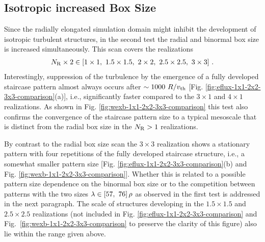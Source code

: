 \newpage
\subsection{Isotropic increased Box Size}
\label{sub:isotropic}

Since the radially elongated simulation domain might inhibit the development of isotropic turbulent structures, in the second test the radial and binormal box size is increased simultaneously.
This scan covers the realizations
\begin{gather*}
	N_\mathrm{R}\times2 \in [1\times1,~1.5\times1.5,~2\times2,~2.5\times2.5,~3\times3]~.
\end{gather*}
Interestingly, suppression of the turbulence by the emergence of a fully developed staircase pattern almost always occurs after $\sim 1000~R/v_{\mathrm{th}}$ [Fig. \ref{fig:eflux-1x1-2x2-3x3-comparison}(a)], i.e., significantly faster compared to the $3\times1$ and $4\times1$ realizations. 
As shown in Fig. \ref{fig:wexb-1x1-2x2-3x3-comparison} this test also confirms the convergence of the staircase pattern size to a typical mesoscale that is distinct from the radial box size in the $N_\mathrm{R} > 1$ realizations.


By contrast to the radial box size scan the $3\times3$ realization shows a stationary pattern with four repetitions of the fully developed staircase structure, i.e., a somewhat smaller pattern size [Fig. \ref{fig:eflux-1x1-2x2-3x3-comparison}(b) and Fig. \ref{fig:wexb-1x1-2x2-3x3-comparison}]. 
Whether this is related to a possible pattern size dependence on the binormal box size or to the competition between patterns with the two sizes $\lambda \in [57,~ 76]\,\rho$ as observed in the first test is addressed in the next paragraph.
The scale of structures developing in the $1.5\times1.5$ and $2.5\times2.5$ realizations (not included in Fig. \ref{fig:eflux-1x1-2x2-3x3-comparison} and Fig.~\ref{fig:wexb-1x1-2x2-3x3-comparison} to preserve the clarity of this figure) also lie within the range given above.

